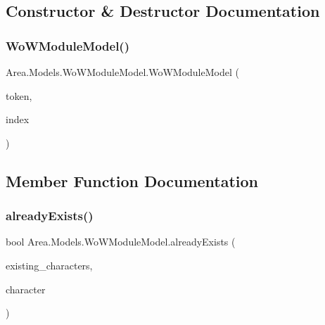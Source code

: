 \subsection{Constructor \& Destructor Documentation}
\mbox{\label{classArea_1_1Models_1_1WoWModuleModel_a515697f205e3c05e96e5cacc95c16800}} 
\subsubsection{\texorpdfstring{Wo\+W\+Module\+Model()}{WoWModuleModel()}}
{\footnotesize\ttfamily Area.\+Models.\+Wo\+W\+Module\+Model.\+Wo\+W\+Module\+Model (\begin{DoxyParamCaption}\item[{string}]{token,  }\item[{int}]{index }\end{DoxyParamCaption})\hspace{0.3cm}{\ttfamily [inline]}}



\subsection{Member Function Documentation}
\mbox{\label{classArea_1_1Models_1_1WoWModuleModel_ad72c3aa9fcf7c7327103e6d885b3b11e}} 
\subsubsection{\texorpdfstring{already\+Exists()}{alreadyExists()}}
{\footnotesize\ttfamily bool Area.\+Models.\+Wo\+W\+Module\+Model.\+already\+Exists (\begin{DoxyParamCaption}\item[{List$<$ \mbox{\hyperlink{classArea_1_1Models_1_1WoWCharacterModel}{Wo\+W\+Character\+Model}} $>$}]{existing\+\_\+characters,  }\item[{\mbox{\hyperlink{classArea_1_1Models_1_1WoWCharacterModel}{Wo\+W\+Character\+Model}}}]{character }\end{DoxyParamCaption})\hspace{0.3cm}{\ttfamily [inline]}}

